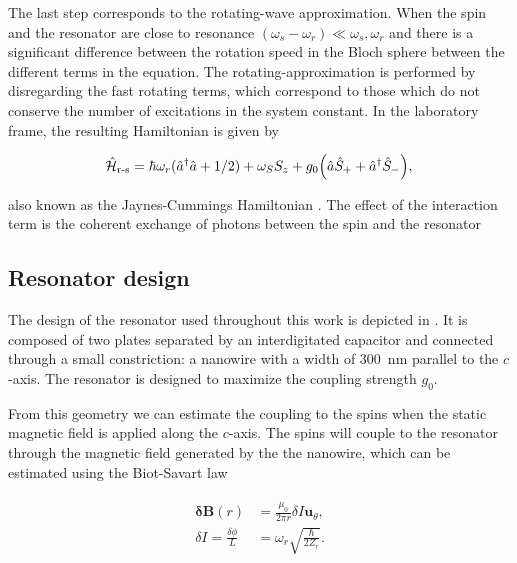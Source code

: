 The last step corresponds to the rotating-wave approximation. When the spin and the resonator are close to resonance $(\omega_{s}-\omega_{r}) \ll \omega_{s}, \omega_r$ and there is a significant difference between the rotation speed in the Bloch sphere between the different terms in the equation. The rotating-approximation is performed by disregarding the fast rotating terms, which correspond to those which do not conserve the number of excitations in the system constant.  In the laboratory frame, the resulting Hamiltonian is given by

\begin{equation}
    \hat{\mathcal{H}}_{\text{r-s}} = \hbar\omega_r(\hat{a}^\dagger \hat{a} + 1/2) +  \omega_S S_z + g_{0} \Big( \hat{a}\hat{S}_{+} + \hat{a}^{\dagger}\hat{S}_{-} \Big), \\
\end{equation}

\noindent also known as the Jaynes-Cummings Hamiltonian . The effect of the interaction term is the coherent exchange of photons between the spin and the resonator

\subsection{Resonator design}

The design of the resonator used throughout this work is depicted in . It is composed of two plates separated by an interdigitated capacitor and connected through a small constriction: a nanowire with a width of 300~nm parallel to the $c$-axis. The resonator is designed to maximize the coupling strength $g_0$.

From this geometry we can estimate the coupling to the spins when the static magnetic field is applied along the $c$-axis. The spins will couple to the resonator through the magnetic field generated by the the nanowire, which can be estimated  using the Biot-Savart law

\begin{align}
\begin{split}
    \boldsymbol{\delta}\mathbf{B}(r) &= \frac{\mu_0}{2 \pi r} \delta I \mathbf{u}_\theta, \\
    \delta I = \frac{\delta \phi}{L} &= \omega_r \sqrt{\frac{\hbar}{2Z_r}}.
\end{split}
\end{align}


